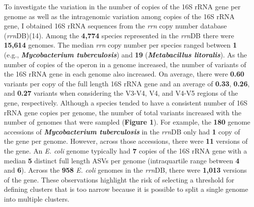 \documentclass[
]{article}
\begin{document}
To investigate the variation in the number of copies of the 16S rRNA
gene per genome as well as the intragenomic variation among copies of
the 16S rRNA gene, I obtained 16S rRNA sequences from the \emph{rrn}
copy number database (\emph{rrn}DB)(14). Among the \textbf{4,774}
species represented in the \emph{rrn}DB there were \textbf{15,614}
genomes. The median \emph{rrn} copy number per species ranged between
\textbf{1} (e.g., \textbf{\emph{Mycobacterium tuberculosis}}) and
\textbf{19} (\textbf{\emph{Metabacillus litoralis}}). As the number of
copies of the operon in a genome increased, the number of variants of
the 16S rRNA gene in each genome also increased. On average, there were
\textbf{0.60} variants per copy of the full length 16S rRNA gene and an
average of \textbf{0.33}, \textbf{0.26}, and \textbf{0.27} variants when
considering the V3-V4, V4, and V4-V5 regions of the gene, respectively.
Although a species tended to have a consistent number of 16S rRNA gene
copies per genome, the number of total variants increased with the
number of genomes that were sampled (\textbf{Figure 1}). For example,
the \textbf{180} genome accessions of \textbf{\emph{Mycobacterium
tuberculosis}} in the \emph{rrn}DB only had \textbf{1} copy of the gene
per genome. However, across those accessions, there were \textbf{11}
versions of the gene. An \emph{E. coli} genome typically had \textbf{7}
copies of the 16S rRNA gene with a median \textbf{5} distinct full
length ASVs per genome (intraquartile range between \textbf{4} and
\textbf{6}). Across the \textbf{958} \emph{E. coli} genomes in the
\emph{rrn}DB, there were \textbf{1,013} versions of the gene. These
observations highlight the risk of selecting a threshold for defining
clusters that is too narrow because it is possible to split a single
genome into multiple clusters.
\end{document}
